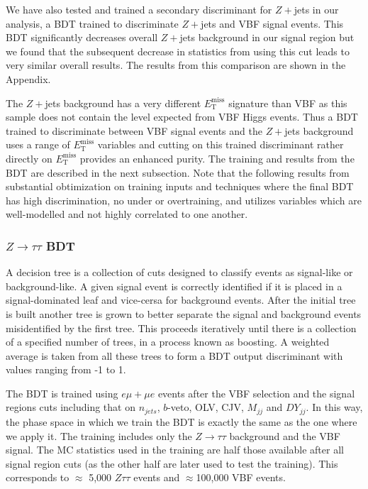 We have also tested and trained a secondary discriminant for $Z+$jets in our analysis, a BDT trained to discriminate $Z+$jets and VBF signal events. This BDT significantly decreases overall $Z+$jets background in our signal region but we found that the subsequent decrease in statistics from using this cut leads to very similar overall results. The results from this comparison are shown in the Appendix. 

The $Z+$jets background has a very different $E_{\text{T}}^{\text{miss}}$ signature than VBF as this sample does not contain the level expected from VBF Higgs events. Thus a BDT trained to discriminate between VBF signal events and the $Z+$jets background uses a range of $E_{\text{T}}^{\text{miss}}$ variables and cutting on this trained discriminant rather directly on $E_{\text{T}}^{\text{miss}}$ provides an enhanced purity. The training and results from the BDT are described in the next subsection. Note that the following results from substantial obtimization on training inputs and techniques where the final BDT has high discrimination, no under or overtraining, and utilizes variables which are well-modelled and not highly correlated to one another.  

\subsubsection{$Z\rightarrow\tau\tau$ BDT}
A decision tree is a collection of cuts designed to classify events as signal-like or background-like. A given signal event is correctly identified if it is placed in a signal-dominated leaf and vice-cersa for background events. After the initial tree is built another tree is grown to better separate the signal and background events misidentified by the first tree. This proceeds iteratively until there is a collection of a specified number of trees, in a process known as boosting. A weighted average is taken from all these trees to form a BDT output discriminant with values ranging from -1 to 1.

The BDT is trained using $e\mu+\mu e$ events after the VBF selection and the signal regions cuts including that on $n_{jets}$, $b$-veto, OLV, CJV, $M_{jj}$ and $DY_{jj}$. In this way, the phase space in which we train the BDT is exactly the same as the one where we apply it. The training includes only the $Z\rightarrow\tau\tau$ background and the VBF signal. The MC statistics used in the training are half those available after all signal region cuts (as the other half are later used to test the training). This corresponds to $\approx$ 5,000 $Z\tau\tau$ events and $\approx$100,000 VBF events.

